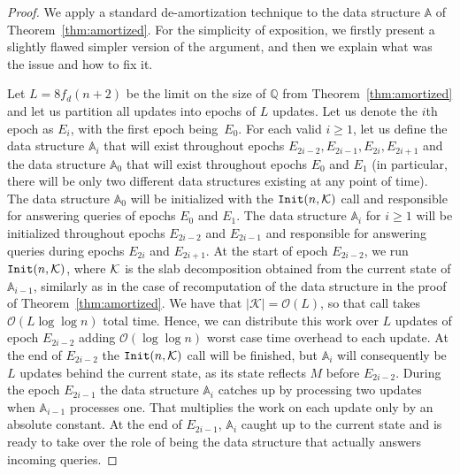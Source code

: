 \documentclass[runningheads]{llncs}
\newcommand{\Oh}{\mathcal{O}}
\renewcommand{\ge}{\geqslant}
\begin{document}
\begin{proof}
We apply a standard de-amortization technique to the data structure
$\mathbb{A}$ of Theorem~\ref{thm:amortized}. For the simplicity of exposition, we firstly present a slightly flawed simpler version of the argument, and then we explain what was the issue and how to fix it.

Let $L=8 f_d(n+2)$ be the limit on the size of $\mathbb{Q}$ from Theorem~\ref{thm:amortized} and let us partition all updates into epochs of $L$ updates. Let us denote the $i$th epoch as $E_i$, with the first epoch being~$E_0$. For each valid $i \ge 1$, let us define the data structure $\mathbb{A}_i$ that will exist throughout epochs $E_{2i-2}, E_{2i-1}, E_{2i}, E_{2i+1}$ and the data structure $\mathbb{A}_0$ that will exist throughout epochs $E_0$ and $E_1$ (in particular, there will be only two different data structures existing at any point of time). The data structure $\mathbb{A}_0$ will be initialized with the $\mathtt{Init}(n, \cal K)$ call and responsible for answering queries of epochs $E_0$ and $E_1$. The data structure $\mathbb{A}_i$ for $i \ge 1$ will be initialized throughout epochs $E_{2i-2}$ and $E_{2i-1}$ and responsible for answering queries during epochs $E_{2i}$ and $E_{2i+1}$. At the start of epoch $E_{2i-2}$, we run $\mathtt{Init}(n, \cal K)$, where $\cal K$ is the slab decomposition obtained from the current state of $\mathbb{A}_{i-1}$, similarly as in the case of recomputation of the data structure in the proof of Theorem~\ref{thm:amortized}. We have that $|\mathcal{K}| = \Oh(L)$, so that call takes $\Oh(L \log \log n)$ total time. Hence, we can distribute this work over $L$ updates of epoch $E_{2i-2}$ adding $\Oh(\log \log n)$ worst case time overhead to each update. At the end of $E_{2i-2}$ the $\mathtt{Init}(n, \cal K)$ call will be finished, but $\mathbb{A}_i$ will consequently be $L$ updates behind the current state, as its state reflects $M$ before $E_{2i-2}$. During the epoch $E_{2i-1}$ the data structure $\mathbb{A}_i$ catches up by processing two updates when $\mathbb{A}_{i-1}$ processes one. That multiplies the work on each update only by an absolute constant. At the end of $E_{2i-1}$, $\mathbb{A}_i$ caught up to the current state and is ready to take over the role of being the data structure that actually answers incoming queries.


\end{proof}
\end{document}
